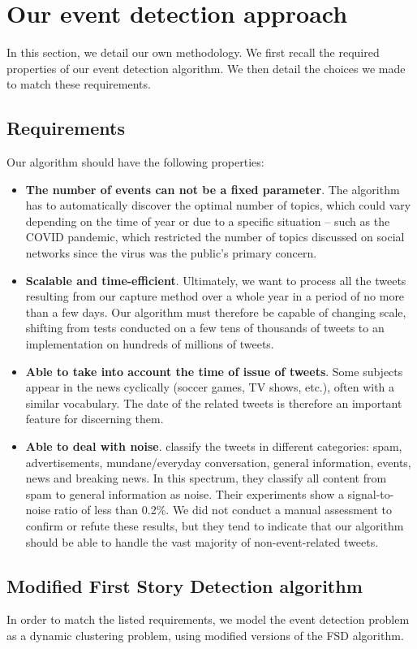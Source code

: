 \section{Our event detection approach}

In this section, we detail our own methodology. We first recall the required properties of our event detection algorithm. We then detail the choices we made to match these requirements.
\subsection{Requirements}
Our algorithm should have the following properties:
\begin{itemize}
    \item \textbf{The number of events can not be a fixed parameter}. The algorithm has to automatically discover the optimal number of topics, which could vary depending on the time of year or due to a specific situation -- such as the COVID pandemic, which restricted the number of topics discussed on social networks since the virus was the public's primary concern.
    \item \textbf{Scalable and time-efficient}. Ultimately, we want to process all the tweets resulting from our capture method over a whole year in a period of no more than a few days. Our algorithm must therefore be capable of changing scale, shifting from tests conducted on a few tens of thousands of tweets to an implementation on hundreds of millions of tweets.
    \item \textbf{Able to take into account the time of issue of tweets}. Some subjects appear in the news cyclically (soccer games, TV shows, etc.), often with a similar vocabulary. The date of the related tweets is therefore an important feature for discerning them.
    \item \textbf{Able to deal with noise}. \citet{liu_reuters_2017} classify the tweets in different categories: spam, advertisements, mundane/everyday conversation, general information, events, news and breaking news. In this spectrum, they classify all content from spam to general information as noise. Their experiments show a signal-to-noise ratio of less than 0.2\%. We did not conduct a manual assessment to confirm or refute these results, but they tend to indicate that our algorithm should be able to handle the vast majority of non-event-related tweets.
\end{itemize}

\subsection{Modified First Story Detection algorithm}
In order to match the listed requirements, we model the event detection problem as a dynamic clustering problem, using modified versions of the FSD algorithm.
